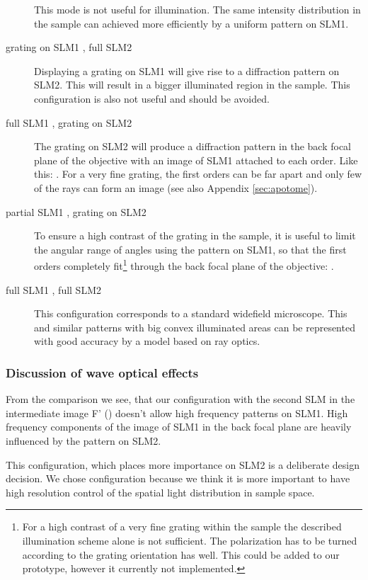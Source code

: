 \begin{description}
  This mode is not useful for illumination. The same intensity
  distribution in the sample can achieved more efficiently by a
  uniform pattern on SLM1.
\item[grating on SLM1 \sm{grating-circle}, full SLM2 \sm{full}]
  Displaying a grating on SLM1 will give rise to a diffraction pattern
  on SLM2. This will result in a bigger illuminated region in the
  sample. This configuration is also not useful and should be avoided.
\item[full SLM1 \sm{full}, grating on SLM2 \sm{grating}] The grating
  on SLM2 will produce a diffraction pattern in the back focal plane
  of the objective with an image of SLM1 attached to each order. Like
  this: . For a very fine grating, the first orders can be
  far apart and only few of the rays can form an image (see also
  Appendix \ref{sec:apotome}).
\item[partial SLM1 \sm{half}, grating on SLM2\sm{grating}] To ensure a
  high contrast of the grating in the sample, it is useful to limit
  the angular range of angles using the pattern on SLM1, so that the
  first orders completely fit\footnote{For a high contrast of a very
    fine grating within the sample the described illumination scheme
    alone is not sufficient. The polarization has to be turned
    according to the grating orientation has well. This could be added
    to our prototype, however it currently not implemented.} through
  the back focal plane of the objective: .
\item[full SLM1 \sm{full}, full SLM2 \sm{full}] This configuration
  corresponds to a standard widefield microscope. This and similar
  patterns with big convex illuminated areas can be represented with
  good accuracy by a model based on ray optics.
\end{description}

\subsubsection{Discussion of wave optical effects}
From the comparison we see, that our configuration with the second SLM
in the intermediate image F' () doesn't allow
high frequency patterns on SLM1. High frequency components of the
image of SLM1 in the back focal plane are heavily influenced by the
pattern on SLM2.

This configuration, which places more importance on SLM2 is a
deliberate design decision.  We chose configuration because we think
it is more important to have high resolution control of the spatial
light distribution in sample space.

